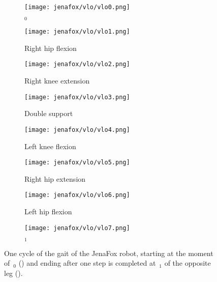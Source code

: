 \begin{figure}[H]%
    \centering%
    \begin{subfigure}[t]{0.2\linewidth}%
        \centering%
        \texttt{[image: jenafox/vlo/vlo0.png]}
        \caption{$_{0}$}%
        \label{fig:jenafox-vlo0}%
    \end{subfigure}%
    \begin{subfigure}[t]{0.2\linewidth}%
        \centering%
        \texttt{[image: jenafox/vlo/vlo1.png]}
        \caption{Right hip flexion}%
        \label{fig:jenafox-vlo1}%
        \vspace*{2mm}%
    \end{subfigure}%
    \begin{subfigure}[t]{0.2\linewidth}%
        \centering%
        \texttt{[image: jenafox/vlo/vlo2.png]}
        \caption{Right knee extension}%
        \label{fig:jenafox-vlo2}%
        \vspace*{2mm}%
    \end{subfigure}%
    \begin{subfigure}[t]{0.2\linewidth}%
        \centering%
        \texttt{[image: jenafox/vlo/vlo3.png]}
        \caption{Double support}%
        \label{fig:jenafox-vlo3}%
        \vspace*{2mm}%
    \end{subfigure}%
    \vfil
    \begin{subfigure}[b]{0.2\linewidth}%
        \centering%
        \texttt{[image: jenafox/vlo/vlo4.png]}
        \caption{Left knee flexion}%
        \label{fig:jenafox-vlo4}%
    \end{subfigure}%
    \begin{subfigure}[b]{0.2\linewidth}%
        \centering%
        \texttt{[image: jenafox/vlo/vlo5.png]}
        \caption{Right hip extension}%
        \label{fig:jenafox-vlo5}%
    \end{subfigure}%
    \begin{subfigure}[b]{0.2\linewidth}%
        \centering%
        \texttt{[image: jenafox/vlo/vlo6.png]}
        \caption{Left hip flexion}%
        \label{fig:jenafox-vlo6}%
    \end{subfigure}%
    \begin{subfigure}[b]{0.2\linewidth}%
        \centering%
        \texttt{[image: jenafox/vlo/vlo7.png]}
        \caption{$_{1}$}%
        \label{fig:jenafox-vlo7}%
    \end{subfigure}%
    \caption{One cycle of the gait of the JenaFox robot, starting at the moment of~$_{0}$ () and ending after one step is completed at~$_{1}$ of the opposite leg ().}%
    \label{fig:jenafox-vlo}%
\end{figure}%

